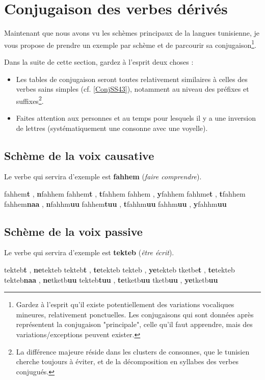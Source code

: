 \section{Conjugaison des verbes dérivés}
Maintenant que nous avons vu les schèmes principaux de la langues tunisienne, je vous propose de prendre un exemple par schème et de parcourir sa conjugaison\footnote{Gardez à l'esprit qu'il existe potentiellement des variations vocaliques mineures, relativement ponctuelles. Les conjugaisons qui sont données après représentent la conjugaison "principale", celle qu'il faut apprendre, mais des variations/exceptions peuvent exister.}.

Dans la suite de cette section, gardez à l'esprit deux choses : 
\begin{itemize}
    \item Les tables de conjugaison seront toutes relativement similaires à celles des verbes sains simples (cf. \ref{ConjSS43}), notamment au niveau des préfixes et suffixes\footnote{La différence majeure réside dans les clusters de consonnes, que le tunisien cherche toujours à éviter, et de la décomposition en syllabes des verbes conjugués.}. 
    \item Faites attention aux personnes et au temps pour lesquels il y a une inversion de lettres (systématiquement une consonne avec une voyelle).
\end{itemize}

\subsection{Schème de la voix causative}
Le verbe qui servira d'exemple est \textbf{fahhem} (\textit{faire comprendre}).

    {fahhem\textbf{t} , \textbf{n}fahhem}
    {fahhem\textbf{t} , \textbf{t}fahhem} 
    {fahhem , \textbf{y}fahhem}
    {fahhme\textbf{t} , \textbf{t}fahhem}
    {fahhem\textbf{naa} , \textbf{n}fahhm\textbf{uu}}
    {fahhem\textbf{tuu} , \textbf{t}fahhm\textbf{uu}} 
    {fahhm\textbf{uu} , \textbf{y}fahhm\textbf{uu}} 


\subsection{Schème de la voix passive}
Le verbe qui servira d'exemple est \textbf{tekteb} (\textit{être écrit}).


 {tekteb\textbf{t} , \textbf{ne}tekteb}
 {tekteb\textbf{t} , \textbf{te}tekteb} 
 {tekteb , \textbf{ye}tekteb}
 {tketbe\textbf{t} , \textbf{te}tekteb}
 {tekteb\textbf{naa} , \textbf{ne}tketb\textbf{uu}}
 {tekteb\textbf{tuu} , \textbf{te}tketb\textbf{uu}}
 {tketb\textbf{uu} , \textbf{ye}tketb\textbf{uu}}


